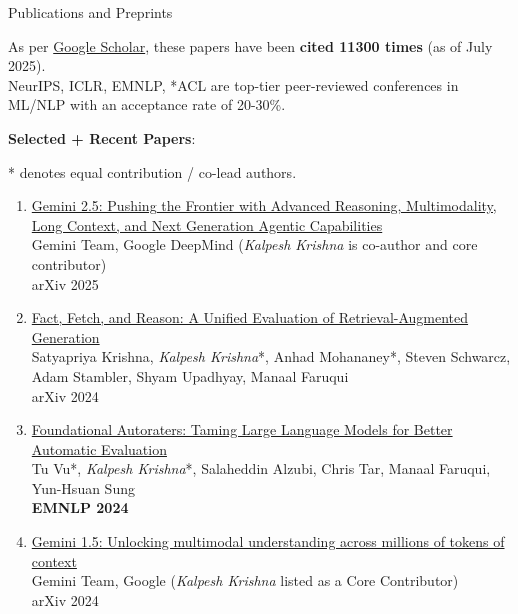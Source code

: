 \documentclass{resume} %
\begin{document}
\begin{rSection}{Publications and Preprints}
\vspace*{0.1in}

As per \href{https://scholar.google.com/citations?hl=en&user=9g2BsMUAAAAJ}{Google Scholar}, these papers have been \textbf{cited 11300 times} (as of July 2025).\\
NeurIPS, ICLR, EMNLP, *ACL are top-tier peer-reviewed conferences in ML/NLP with an acceptance rate of  20-30\%.

\vspace{0.05in}

\textbf{Selected + Recent Papers}:

* denotes equal contribution / co-lead authors.

\begin{enumerate}[leftmargin=*]
\setlength\itemsep{0.4em}

\item \href{https://arxiv.org/abs/2507.06261}{Gemini 2.5: Pushing the Frontier with Advanced Reasoning, Multimodality, Long Context, and Next Generation Agentic Capabilities} \\
Gemini Team, Google DeepMind (\emph{Kalpesh Krishna} is co-author and core contributor) \\
arXiv 2025

\item \href{https://arxiv.org/abs/2409.12941}{Fact, Fetch, and Reason: A Unified Evaluation of Retrieval-Augmented Generation} \\
Satyapriya Krishna, \emph{Kalpesh Krishna}*, Anhad Mohananey*, Steven Schwarcz, Adam Stambler, Shyam Upadhyay, Manaal Faruqui\\
arXiv 2024

\item \href{https://arxiv.org/abs/2407.10817}{Foundational Autoraters: Taming Large Language Models for Better Automatic Evaluation} \\
Tu Vu*, \emph{Kalpesh Krishna}*, Salaheddin Alzubi, Chris Tar, Manaal Faruqui, Yun-Hsuan Sung \\
\textbf{EMNLP 2024}

\item \href{https://storage.googleapis.com/deepmind-media/gemini/gemini_v1_5_report.pdf}{Gemini 1.5: Unlocking multimodal understanding across millions of tokens of context} \\
Gemini Team, Google (\emph{Kalpesh Krishna} listed as a Core Contributor) \\
arXiv 2024


\end{enumerate}
\end{rSection}
\end{document}
